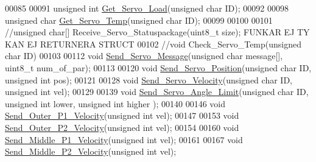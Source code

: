 \begin{DoxyCode}
00085 
00091 \textcolor{keywordtype}{unsigned} \textcolor{keywordtype}{int} \hyperlink{servo___u_a_r_t_8h_a1aae94381111766cdccb93eae5b5c382}{Get\_Servo\_Load}(\textcolor{keywordtype}{unsigned} \textcolor{keywordtype}{char} ID);
00092 
00098 \textcolor{keywordtype}{unsigned} \textcolor{keywordtype}{char} \hyperlink{servo___u_a_r_t_8h_a5990b8542094df57d8fda7c5a3f26bed}{Get\_Servo\_Temp}(\textcolor{keywordtype}{unsigned} \textcolor{keywordtype}{char} ID);
00099 
00100 
00101 \textcolor{comment}{//unsigned char[] Receive\_Servo\_Statuspackage(uint8\_t size); FUNKAR EJ TY KAN EJ RETURNERA STRUCT}
00102 \textcolor{comment}{//void Check\_Servo\_Temp(unsigned char ID)}
00103 
00112 \textcolor{keywordtype}{void} \hyperlink{servo___u_a_r_t_8h_a2ed3a2903977a774d1b174665d50661c}{Send\_Servo\_Message}(\textcolor{keywordtype}{unsigned} \textcolor{keywordtype}{char} message[], uint8\_t num\_of\_par);
00113 
00120 \textcolor{keywordtype}{void} \hyperlink{servo___u_a_r_t_8h_a5ed0e49737d1eaf80665c285396b4337}{Send\_Servo\_Position}(\textcolor{keywordtype}{unsigned} \textcolor{keywordtype}{char} ID, \textcolor{keywordtype}{unsigned} \textcolor{keywordtype}{int} pos);
00121 
00128 \textcolor{keywordtype}{void} \hyperlink{servo___u_a_r_t_8h_ac325c1636bc0a1c5b6cbe967bca0a6d2}{Send\_Servo\_Velocity}(\textcolor{keywordtype}{unsigned} \textcolor{keywordtype}{char} ID, \textcolor{keywordtype}{unsigned} \textcolor{keywordtype}{int} vel);
00129 
00139 \textcolor{keywordtype}{void} \hyperlink{servo___u_a_r_t_8h_aae1b10368951b07e7049392da8e8160b}{Send\_Servo\_Angle\_Limit}(\textcolor{keywordtype}{unsigned} \textcolor{keywordtype}{char} ID, \textcolor{keywordtype}{unsigned} \textcolor{keywordtype}{int} lower, \textcolor{keywordtype}{unsigned} \textcolor{keywordtype}{int} higher
      );
00140 
00146 \textcolor{keywordtype}{void} \hyperlink{servo___u_a_r_t_8h_a30fbb081db7418d454bfe8761ca59dd2}{Send\_Outer\_P1\_Velocity}(\textcolor{keywordtype}{unsigned} \textcolor{keywordtype}{int} vel); 
00147 
00153 \textcolor{keywordtype}{void} \hyperlink{servo___u_a_r_t_8h_a6c4f4c2915df647ac40c86c17e613e30}{Send\_Outer\_P2\_Velocity}(\textcolor{keywordtype}{unsigned} \textcolor{keywordtype}{int} vel); 
00154 
00160 \textcolor{keywordtype}{void} \hyperlink{servo___u_a_r_t_8h_a63e528b1a0c31e9912ebbceee58a5faa}{Send\_Middle\_P1\_Velocity}(\textcolor{keywordtype}{unsigned} \textcolor{keywordtype}{int} vel); 
00161 
00167 \textcolor{keywordtype}{void} \hyperlink{servo___u_a_r_t_8h_aae94fcd8998679345fa7d70648bd2a1e}{Send\_Middle\_P2\_Velocity}(\textcolor{keywordtype}{unsigned} \textcolor{keywordtype}{int} vel); 

\end{DoxyCode}
